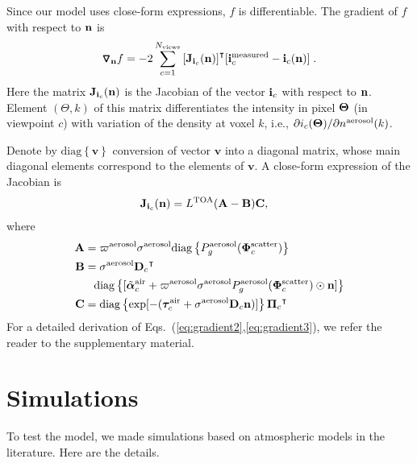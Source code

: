 \documentclass[10pt,twocolumn,letterpaper]{article}
\newcommand{\OpDiag}[1]{\mathrm{diag}\left\{#1\right\}}
\newcommand{\Grad}[1]{\bm{\triangledown_{#1}}}
\newcommand{\vect}[1]{\bm{#1}}
\newcommand{\transpose}[1]{{#1}^\intercal}
\begin{document}
Since our model uses close-form expressions, $f$ is differentiable. The gradient of $f$ with respect to ${\bf n}$ is
\begin{align}
  \Grad{{\bf n}} f = -2\sum_{c=1}^{N_{\rm views}}
  \transpose{\left[{\bf J}_{{\bf i}_c}({\bf n})\right]}
  [{\bf i}^{\rm measured}_c - {\bf i}_c({\bf n})]
  \;.
  \label{eq:gradient1}
\end{align}
Here the matrix ${\bf J}_{{\bf i}_c}({\bf n})$ is the Jacobian  of
the vector ${\bf i}_c$ with respect to ${\bf n}$. Element $(\Theta,k)$ of this matrix
differentiates the intensity in pixel ${\bf \Theta}$ (in viewpoint $c$) with variation of the density at voxel $k$, i.e.,
  $\partial i_c({\bf \Theta})/\partial{n^{\rm aerosol}(k)}$.

Denote by $\OpDiag{\vect{v}}$ conversion of vector $\vect{v}$ into a diagonal matrix, whose main diagonal elements correspond to the elements of $\vect{v}$.
A close-form expression of the Jacobian is
\begin{align}
  {\bf J}_{{\bf i}_c}({\bf n}) &=
    L^{\rm TOA}({\bf A}-{\bf B}){\bf C} ,
  \label{eq:gradient2}
\end{align}
where
\begin{align}
  \label{eq:gradient3}
  {\bf A} &=
    \varpi^{\rm aerosol}\sigma^{\rm aerosol}
         \OpDiag{ P_g^{\rm aerosol}(\vect{\Phi}^{\rm scatter}_c)} \nonumber\\
 {\bf B} &= {\sigma}^{\rm aerosol}\transpose{{\bf D}_c} \nonumber\\
       & \;\;\;
       \OpDiag{[\tilde{\vect{\alpha}}^{\rm air}_c
                + \varpi^{\rm aerosol}\sigma^{\rm aerosol}
                P^{\rm aerosol}_g(\vect{\Phi}^{\rm scatter}_c) \odot{\bf n}
                ]} \nonumber \\
  {\bf C} &= \OpDiag{\exp[-(\vect{\tau}_c^{\rm air}
          + {\sigma}^{\rm aerosol} {\bf D}_c {\bf n})]}
          \transpose{{\vect{\Pi}}_c}
\end{align}
For a detailed derivation of Eqs.~(\ref{eq:gradient2},\ref{eq:gradient3}),
we refer the reader to the supplementary material.



\section{Simulations}
\label{sec:simul}

To test the model, we made simulations based on atmospheric models in the literature. Here are the details.\\
\end{document}
